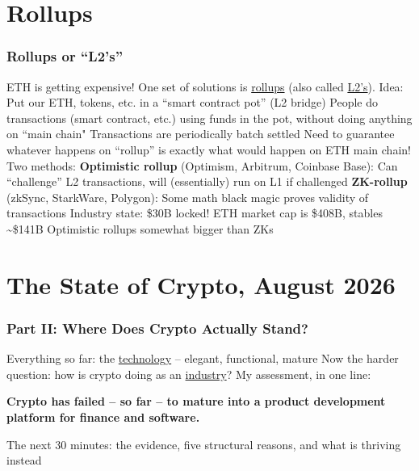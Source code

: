 \documentclass[aspectratio=169]{beamer}
\begin{document}
\section{Rollups}

\begin{frame}
\frametitle{Rollups or ``L2's''}

ETH is getting expensive! One set of solutions is \ul{rollups} (also called \ul{L2's}). Idea:
\bi
\m Put our ETH, tokens, etc. in a ``smart contract pot'' (L2 bridge)
\m People do transactions (smart contract, etc.) using funds in the pot, without doing anything on ``main chain"
\m Transactions are periodically batch settled \pause
\m Need to guarantee whatever happens on ``rollup'' is exactly what would happen on ETH main chain! Two methods:
\bi
\m \textbf{Optimistic rollup} (Optimism, Arbitrum, Coinbase Base): Can ``challenge'' L2 transactions, will (essentially) run on L1 if challenged
\m \textbf{ZK-rollup} (zkSync, StarkWare, Polygon): Some math black magic proves validity of transactions
\ei \pause
\m Industry state: 
\bi
\m \$30B locked! ETH market cap is \$408B, stables \textasciitilde\$141B
\m Optimistic rollups somewhat bigger than ZKs
\ei
\ei

\end{frame}



\section{The State of Crypto, August 2026}

\begin{frame}
\frametitle{Part II: Where Does Crypto Actually Stand?}

\bi
\m Everything so far: the \ul{technology} -- elegant, functional, mature \pause
\m Now the harder question: how is crypto doing as an \ul{industry}? \pause
\m My assessment, in one line: \\
\vspace{2mm}
\begin{center}
\textbf{Crypto has failed -- so far -- to mature into a product development platform for finance and software.}
\end{center}
\vspace{2mm} \pause
\m The next 30 minutes: the evidence, five structural reasons, and what is thriving instead
\ei

\end{frame}
\end{document}
